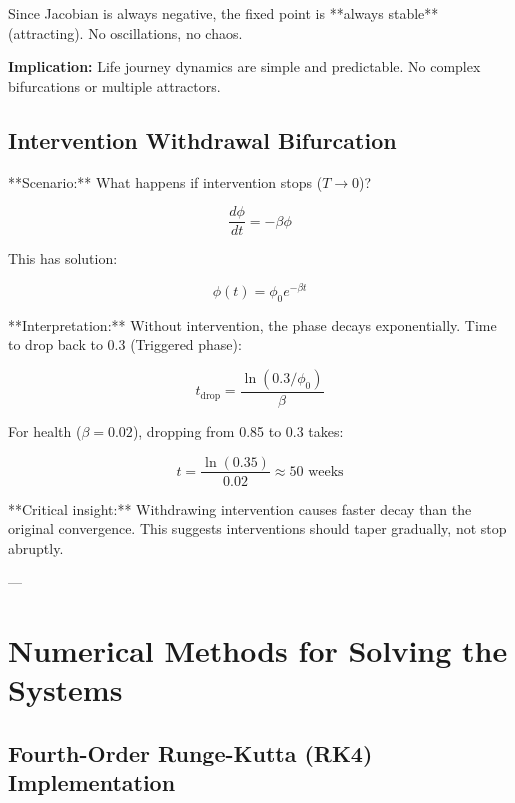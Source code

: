 Since Jacobian is always negative, the fixed point is **always stable** (attracting). No oscillations, no chaos.

\textbf{Implication:} Life journey dynamics are simple and predictable. No complex bifurcations or multiple attractors.

\subsection{Intervention Withdrawal Bifurcation}

**Scenario:** What happens if intervention stops ($T \to 0$)?

\begin{equation}
\frac{d\phi}{dt} = -\beta \phi
\end{equation}

This has solution:

\begin{equation}
\phi(t) = \phi_0 e^{-\beta t}
\end{equation}

**Interpretation:** Without intervention, the phase decays exponentially. Time to drop back to 0.3 (Triggered phase):

\begin{equation}
t_{\text{drop}} = \frac{\ln(0.3/\phi_0)}{\beta}
\end{equation}

For health ($\beta = 0.02$), dropping from 0.85 to 0.3 takes:

\begin{equation}
t = \frac{\ln(0.35)}{0.02} \approx 50 \text{ weeks}
\end{equation}

**Critical insight:** Withdrawing intervention causes faster decay than the original convergence. This suggests interventions should taper gradually, not stop abruptly.

---


\section{Numerical Methods for Solving the Systems}
\label{ooo:numerical}

\subsection{Fourth-Order Runge-Kutta (RK4) Implementation}

